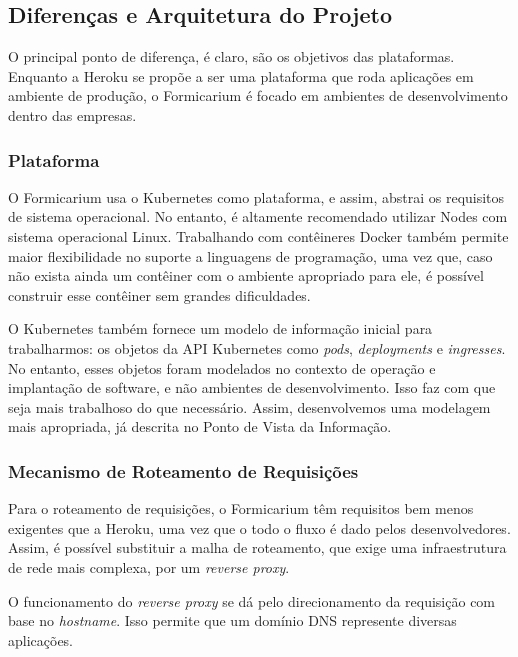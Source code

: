         \subsection{Diferenças e Arquitetura do Projeto}
            O principal ponto de diferença, é claro, são os objetivos das plataformas. Enquanto a Heroku se propõe a ser uma plataforma que roda aplicações em ambiente de produção, o Formicarium é focado em ambientes de desenvolvimento dentro das empresas.
            
            \subsubsection{Plataforma}
                O Formicarium usa o Kubernetes como plataforma, e assim, abstrai os requisitos de sistema operacional. No entanto, é altamente recomendado utilizar Nodes com sistema operacional Linux. Trabalhando com contêineres Docker também permite maior flexibilidade no suporte a linguagens de programação, uma vez que, caso não exista ainda um contêiner com o ambiente apropriado para ele, é possível construir esse contêiner sem grandes dificuldades.
                
                O Kubernetes também fornece um modelo de informação inicial para trabalharmos: os objetos da API Kubernetes como \textit{pods}, \textit{deployments} e \textit{ingresses}. No entanto, esses objetos foram modelados no contexto de operação e implantação de software, e não ambientes de desenvolvimento. Isso faz com que seja mais trabalhoso do que necessário. Assim, desenvolvemos uma modelagem mais apropriada, já descrita no Ponto de Vista da Informação.
                
            \subsubsection{Mecanismo de Roteamento de Requisições}
                Para o roteamento de requisições, o Formicarium têm requisitos bem menos exigentes que a Heroku, uma vez que o todo o fluxo é dado pelos desenvolvedores. Assim, é possível substituir a malha de roteamento, que exige uma infraestrutura de rede mais complexa, por um \textit{reverse proxy}.
                
                O funcionamento do \textit{reverse proxy} se dá pelo direcionamento da requisição com base no \textit{hostname}. Isso permite que um domínio DNS represente diversas aplicações.
                
